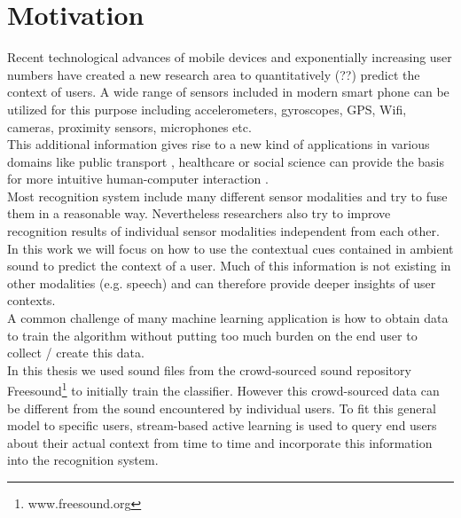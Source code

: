 \chapter{Motivation}\label{cha1}
Recent technological advances of mobile devices and exponentially increasing user numbers have created a new research area to quantitatively (??) predict the context of users. A wide range of sensors included in modern smart phone can be utilized for this purpose including accelerometers, gyroscopes, GPS, Wifi, cameras, proximity sensors, microphones etc.\\
This additional information gives rise to a new kind of applications in various domains like public transport \cite{Thiagarajan2014}, healthcare \cite{Bricon-Souf2007} or social science \cite{Eagle2005} can provide the basis for more intuitive human-computer interaction \cite{Schmidt1999}.\\
Most recognition system include many different sensor modalities and try to fuse them in a reasonable way. Nevertheless researchers also try to improve recognition results of individual sensor modalities independent from each other.\\
In this work we will focus on how to use the contextual cues contained in ambient sound to predict the context of a user. Much of this information is not existing in other modalities (e.g. speech) and can therefore provide deeper insights of user contexts.\\
A common challenge of many machine learning application is how to obtain data to train the algorithm without putting too much burden on the end user to collect / create this data.\\
In this thesis we used sound files from the crowd-sourced sound repository Freesound\footnote{www.freesound.org} to initially train the classifier. However this crowd-sourced data can be different from the sound encountered by individual users. To fit this general model to specific users, stream-based active learning is used to query end users about their actual context from time to time and incorporate this information into the recognition system. 







